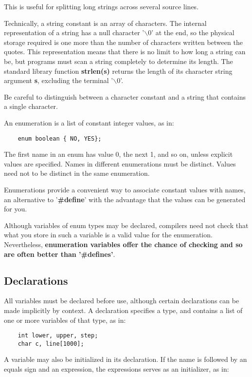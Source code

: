 \documentclass{article}
\begin{document}
This is useful for splitting long strings across several source lines.

Technically, a string constant is an array of characters. The internal representation of a string has a null character '$\backslash$0' at the end, so the physical storage required is one more than the number of characters written between the quotes. This representation means that there is no limit to how long a string can be, but programs must scan a string completely to determine its length. The standard library function \textbf{strlen(s)} returns the length of its character string argument \textbf{s}, excluding the terminal '$\backslash$0'.

Be careful to distinguish between a character constant and a string that contains a single character.

An enumeration is a list of constant integer values, as in:

\begin {lstlisting}
	enum boolean { NO, YES};
\end{lstlisting}

The first name in an enum has value 0, the next 1, and so on, unless explicit values are specified. 
Names in different enumerations must be distinct. Values need not to be distinct in the same enumeration.

Enumerations provide a convenient way to associate constant values with names, an alternative to '\textbf{\#define}' with the advantage that the values can be generated for you. 

Although variables of enum types may be declared, compilers need not check that what you store in such a variable is a valid value for the enumeration. Nevertheless, \textbf{enumeration variables offer the chance of checking and so are often better than '\#defines'}.

\subsection{Declarations}

All variables must be declared before use, although certain declarations can be made implicitly by context. A declaration specifies a type, and contains a list of one or more variables of that type, as in:

\begin{lstlisting}
	int lower, upper, step;
	char c, line[1000];
\end{lstlisting}

A variable may also be initialized in its declaration. If the name is followed by an equals sign and an expression, the expressions serves as an initializer, as in:
\end{document}
